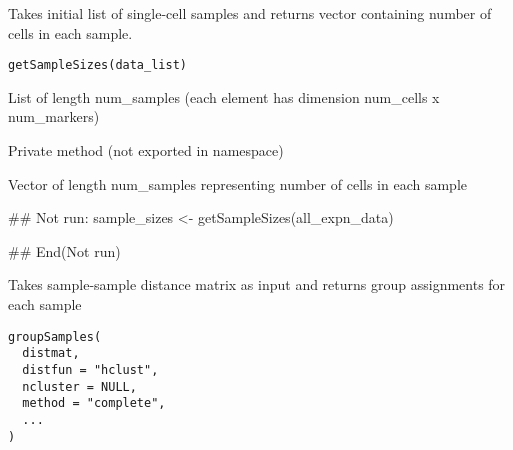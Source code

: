 \documentclass[a4paper]{book}
\begin{document}
%
\begin{Description}\relax
Takes initial list of single-cell samples and returns vector containing number of cells in each sample.
\end{Description}
%
\begin{Usage}
\begin{verbatim}
getSampleSizes(data_list)
\end{verbatim}
\end{Usage}
%
\begin{Arguments}
\begin{ldescription}
\item[\code{data\_list}] List of length num\_samples (each element has dimension num\_cells x num\_markers)
\end{ldescription}
\end{Arguments}
%
\begin{Details}\relax
Private method (not exported in namespace)
\end{Details}
%
\begin{Value}
Vector of length num\_samples representing number of cells in each sample
\end{Value}
%
\begin{Examples}
\begin{ExampleCode}
## Not run: 
sample_sizes <- getSampleSizes(all_expn_data)

## End(Not run)
\end{ExampleCode}
\end{Examples}
%
\begin{Description}\relax
Takes sample-sample distance matrix as input and returns group assignments for each sample
\end{Description}
%
\begin{Usage}
\begin{verbatim}
groupSamples(
  distmat,
  distfun = "hclust",
  ncluster = NULL,
  method = "complete",
  ...
)
\end{verbatim}
\end{Usage}
%
\end{document}

